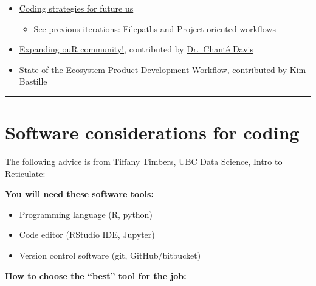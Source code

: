 \documentclass[
  letterpaper,
  DIV=11,
  numbers=noendperiod]{scrreprt}
\providecommand{\tightlist}{%
  \setlength{\itemsep}{0pt}\setlength{\parskip}{0pt}}
\begin{document}
\begin{itemize}
\tightlist
\item
  \href{https://docs.google.com/presentation/d/1nTLJ782dpZqp3MEhQU9zNaFInrTaFUVQbj9OqsmxUYo/edit?usp=sharing}{Coding
  strategies for future us}

  \begin{itemize}
  \tightlist
  \item
    See previous iterations:
    \href{https://docs.google.com/presentation/d/1HbxQ9Lg-ySEhmvH01PnMX0BDuquQezru73GI3PV-Ibo/edit?usp=sharing}{Filepaths}
    and
    \href{https://docs.google.com/presentation/d/1hiSjMjTFhdDO5lLCM4uiU3D8nLFPt8eOEdDPVoaG5UQ/edit?usp=sharing}{Project-oriented
    workflows}
  \end{itemize}
\item
  \href{https://docs.google.com/presentation/d/1a620vM5OkOgcUi0I-mQPV5ZTQglRfwSnAb6O41g8tv0/edit\#slide=id.p1}{Expanding
  ouR community!}, contributed by
  \href{https://twitter.com/DrFintastic}{Dr.~Chanté Davis}
\item
  \href{https://noaa-edab.github.io/presentations/20211015_Openscapes_Bastille.html}{State
  of the Ecosystem Product Development Workflow}, contributed by Kim
  Bastille
\end{itemize}

\begin{center}\rule{0.5\linewidth}{0.5pt}\end{center}

\hypertarget{software-considerations-for-coding}{%
\section{Software considerations for
coding}\label{software-considerations-for-coding}}

The following advice is from Tiffany Timbers, UBC Data Science,
\href{https://github.com/ttimbers/intro-to-reticulate/blob/main/slides/reticulate-intro.pdf}{Intro
to Reticulate}:

\textbf{You will need these software tools:}

\begin{itemize}
\tightlist
\item
  Programming language (R, python)
\item
  Code editor (RStudio IDE, Jupyter)
\item
  Version control software (git, GitHub/bitbucket)
\end{itemize}

\textbf{How to choose the ``best'' tool for the job:}
\end{document}
